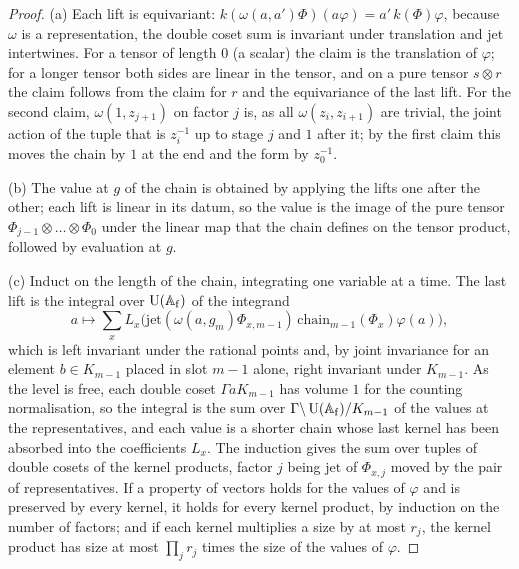\begin{proof}
(a) Each lift is equivariant: $k(\omega(a,a')\Phi)(a\varphi)=a'\,k(\Phi)\varphi$, because $\omega$ is a representation, the double coset sum is invariant under translation and $\mathrm{jet}$ intertwines. For a tensor of length $0$ (a scalar) the claim is the translation of $\varphi$; for a longer tensor both sides are linear in the tensor, and on a
pure tensor $s\otimes r$ the claim follows from the claim for $r$ and the equivariance of the last lift. For the second claim, $\omega(1,z_{j+1})$ on factor $j$ is, as all $\omega(z_i,z_{i+1})$ are trivial, the joint action of the tuple that is $z_i^{-1}$ up to stage $j$ and $1$ after it; by the first claim this moves the chain by $1$ at the
end and the form by $z_0^{-1}$.

(b) The value at $g$ of the chain is obtained by applying the lifts one after the other; each lift is linear in its datum, so the value is the image of the pure tensor $\Phi_{j-1}\otimes\dots\otimes\Phi_0$ under the linear map that the chain defines on the tensor product, followed by evaluation at $g$.

(c) Induct on the length of the chain, integrating one variable at a time. The last lift is the integral over $\operatorname{U}(\mathbb{A}_{\mathrm f})$ of the integrand
\[a\mapsto\sum_xL_x\bigl(\mathrm{jet}(\omega(a,g_m)\Phi_{x,m-1})\,\mathrm{chain}_{m-1}(\Phi_x)\varphi(a)\bigr),\]
which is left invariant under the rational points and, by joint invariance for an element
$b\in K_{m-1}$ placed in slot $m-1$ alone, right invariant under $K_{m-1}$. As the level is free, each double coset $\Gamma aK_{m-1}$ has volume $1$ for the counting normalisation, so the integral is the sum over $\Gamma\backslash\operatorname{U}(\mathbb{A}_{\mathrm f})/K_{m-1}$ of the values at the representatives, and each value is a shorter chain whose last
kernel has been absorbed into the coefficients $L_x$. The induction gives the sum over tuples of double cosets of the kernel products, factor $j$ being $\mathrm{jet}$ of $\Phi_{x,j}$ moved by the pair of representatives. If a property of vectors holds for the values of $\varphi$ and is preserved by every kernel, it holds for every kernel
product, by induction on the number of factors; and if each kernel multiplies a size by at most $r_j$, the kernel product has size at most $\prod_jr_j$ times the size of the values of $\varphi$.
\end{proof}

